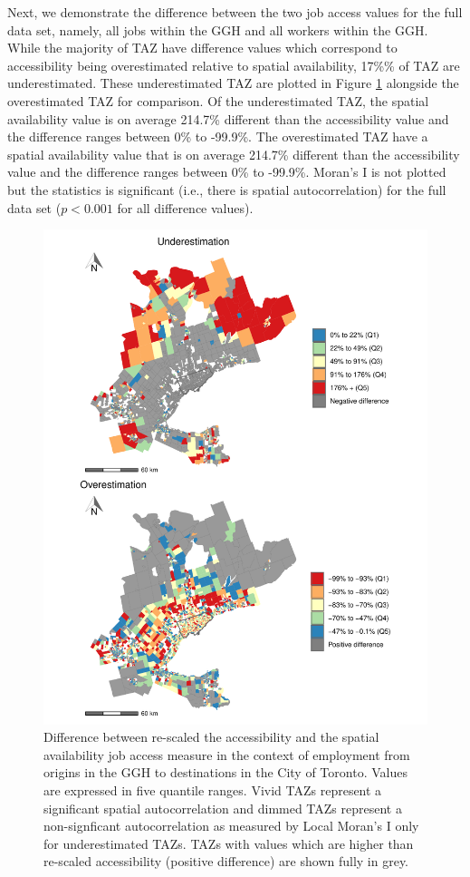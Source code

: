 \documentclass[]{elsarticle} %
\begin{document}
Next, we demonstrate the difference between the two job access values
for the full data set, namely, all jobs within the GGH and all workers
within the GGH. While the majority of TAZ have difference values which
correspond to accessibility being overestimated relative to spatial
availability, 17\%\% of TAZ are underestimated. These underestimated TAZ
are plotted in Figure \ref{fig:plot-difference-GGH} alongside the
overestimated TAZ for comparison. Of the underestimated TAZ, the spatial
availability value is on average 214.7\% different than the
accessibility value and the difference ranges between 0\% to -99.9\%.
The overestimated TAZ have a spatial availability value that is on
average 214.7\% different than the accessibility value and the
difference ranges between 0\% to -99.9\%. Moran's I is not plotted but
the statistics is significant (i.e., there is spatial autocorrelation)
for the full data set (\(p< 0.001\) for all difference values).

\begin{figure}
\includegraphics[width=1\linewidth]{Spatial-Availability_files/figure-latex/plot-difference-GGH-1} \caption{\label{fig:plot-difference-GGH}Difference between re-scaled the accessibility and the spatial availability job access measure in the context of employment from origins in the GGH to destinations in the City of Toronto. Values are expressed in five quantile ranges. Vivid TAZs represent a significant spatial autocorrelation and dimmed TAZs represent a non-signficant autocorrelation as measured by Local Moran's I only for underestimated TAZs. TAZs with values which are higher than re-scaled accessibility (positive difference) are shown fully in grey.}\label{fig:plot-difference-GGH}
\end{figure}
\end{document}
